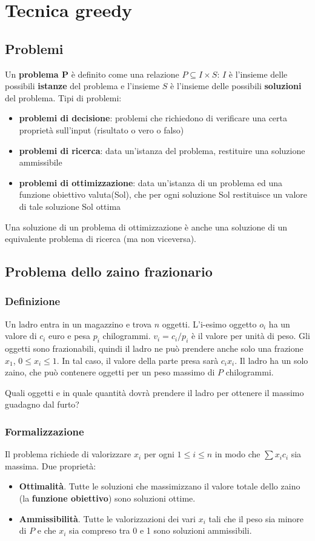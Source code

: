 \documentclass[11pt]{article}
\theoremstyle{proprietà}
\begin{document}
\section{Tecnica greedy}
\subsection{Problemi}
Un \textbf{problema P} è definito come una relazione $P\subseteq I\times S$: $I$ è l'insieme delle possibili \textbf{istanze}
del problema e l'insieme $S$ è l'insieme delle possibili \textbf{soluzioni} del problema.
Tipi di problemi:
\begin{itemize}
    \item \textbf{problemi di decisione}: problemi che richiedono di verificare una certa proprietà sull'input (risultato 
    o vero o falso)
    \item \textbf{problemi di ricerca}: data un'istanza del problema, restituire una soluzione ammissibile
    \item \textbf{problemi di ottimizzazione}: data un'istanza di un problema ed una funzione obiettivo valuta(Sol), che per 
    ogni soluzione Sol restituisce un valore di tale soluzione Sol ottima
\end{itemize}
Una soluzione di un problema di ottimizzazione è anche una soluzione di un equivalente problema di ricerca (ma non viceversa).
\subsection{Problema dello zaino frazionario}
\subsubsection{Definizione}
Un ladro entra in un magazzino e trova $n$ oggetti. L'i-esimo oggetto $o_i$ ha un valore di $c_i$ euro e pesa $p_i$ chilogrammi.
$v_i=c_i/p_i$ è il valore per unità di peso. Gli oggetti sono frazionabili, quindi il ladro ne può prendere anche solo una 
frazione $x_1$, $0\leq x_i \leq 1$. In tal caso, il valore della parte presa sarà $c_ix_i$. Il ladro ha un solo zaino, che 
può contenere oggetti per un peso massimo di $P$ chilogrammi.

Quali oggetti e in quale quantità dovrà prendere il ladro per ottenere il massimo guadagno dal furto?
\subsubsection{Formalizzazione}
Il problema richiede di valorizzare $x_i$ per ogni $1\leq i \leq n$ in modo che $\sum x_ic_i$ sia massima. Due proprietà: 
\begin{itemize}
    \item \textbf{Ottimalità}. Tutte le soluzioni che massimizzano il valore totale dello zaino (la \textbf{funzione obiettivo}) 
    sono soluzioni ottime. 
    \item \textbf{Ammissibilità}. Tutte le valorizzazioni dei vari $x_i$ tali che il peso sia minore di $P$ e che $x_i$ 
    sia compreso tra 0 e 1 sono soluzioni ammissibili.
\end{itemize}
\end{document}
